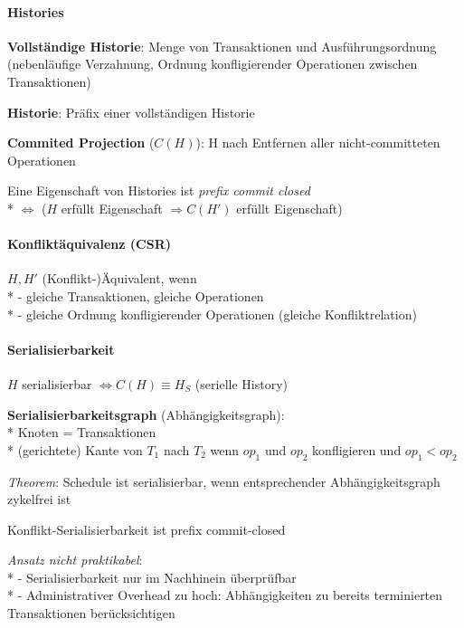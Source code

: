 \paragraph{Histories}
\begin{items}
	\item \textbf{Vollständige Historie}: Menge von Transaktionen und Ausführungsordnung (nebenläufige Verzahnung, Ordnung konfligierender Operationen zwischen Transaktionen)
	\item \textbf{Historie}: Präfix einer vollständigen Historie
	\item \textbf{Commited Projection} (\( C(H) \)): H nach Entfernen aller nicht-committeten Operationen
	\item Eine Eigenschaft von Histories ist \emph{prefix commit closed}
		\\*
		\( \Leftrightarrow \) (\( H \) erfüllt Eigenschaft \( \Rightarrow C(H') \) erfüllt Eigenschaft)
\end{items}

\paragraph{Konfliktäquivalenz (CSR)}
\begin{items}
	\item \( H, H' \) (Konflikt-)Äquivalent, wenn \\*
		- gleiche Transaktionen, gleiche Operationen \\*
		- gleiche Ordnung konfligierender Operationen (gleiche Konfliktrelation)
\end{items}

\paragraph{Serialisierbarkeit}
\begin{items}
	\item \( H \) serialisierbar \( \Leftrightarrow C(H) \equiv H_S \) (serielle History)
	\item \textbf{Serialisierbarkeitsgraph} (Abhängigkeitsgraph):
		\\*
		Knoten = Transaktionen
		\\*
		(gerichtete) Kante von $T_1$ nach $T_2$ wenn $op_1$ und $op_2$ konfligieren und $op_1 < op_2$
	\item \emph{Theorem}: Schedule ist serialisierbar, wenn entsprechender Abhängigkeitsgraph zykelfrei ist
	\item Konflikt-Serialisierbarkeit ist prefix commit-closed
	\item \emph{Ansatz nicht praktikabel}: \\*
		- Serialisierbarkeit nur im Nachhinein überprüfbar \\*
		- Administrativer Overhead zu hoch: Abhängigkeiten zu bereits terminierten Transaktionen berücksichtigen
\end{items}

